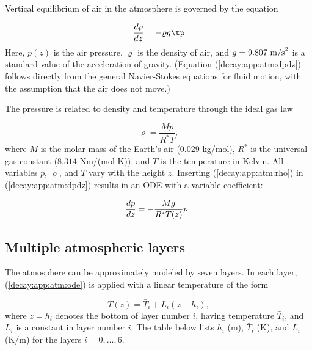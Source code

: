 \documentclass[graybox,sectrefs,envcountresetchap,open=right,final]{svmonodo}
\begin{document}
Vertical equilibrium of air in the atmosphere is governed by
the equation

\begin{equation}
\frac{dp}{dz} = -\varrho g
\tp
\label{decay:app:atm:dpdz}
\end{equation}
Here, $p(z)$ is the air pressure, $\varrho$ is the density of
air, and $g=9.807\hbox{ m/s}^2$ is a standard value of
the acceleration of gravity.
(Equation (\ref{decay:app:atm:dpdz}) follows directly from the general
Navier-Stokes equations for fluid motion, with
the assumption that the air does not move.)

The pressure is related to density and temperature through the ideal gas law

\begin{equation}
\varrho = \frac{Mp}{R^*T}, \label{decay:app:atm:rho}
\end{equation}
where $M$ is the molar mass of the Earth's air (0.029 kg/mol),
$R^*$ is the universal
gas constant ($8.314$ Nm/(mol K)), and $T$ is the temperature in Kelvin.
All variables $p$, $\varrho$, and $T$ vary with the height $z$.
Inserting (\ref{decay:app:atm:rho}) in (\ref{decay:app:atm:dpdz}) results
in an ODE with a variable coefficient:

\begin{equation}
\frac{dp}{dz} = -\frac{Mg}{R^*T(z)} p
\label{decay:app:atm:ode}
\thinspace  .
\end{equation}

\subsection{Multiple atmospheric layers}

The atmosphere can be approximately modeled by seven layers.
In each layer, (\ref{decay:app:atm:ode}) is applied with
a linear temperature of the form

\[ T(z) = \bar T_i + L_i(z-h_i),\]
where $z=h_i$ denotes the bottom of layer number $i$,
having temperature $\bar T_i$,
and $L_i$ is a constant in layer number $i$. The table below
lists $h_i$ (m), $\bar T_i$ (K), and $L_i$ (K/m) for the layers
$i=0,\ldots,6$.
\end{document}
